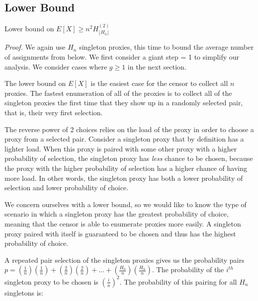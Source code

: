 \subsection{Lower Bound}

\label{theorem:LBEX}
\begin{theorem} {Lower bound on $E[X] \geq n^2H^{(2)}_{\lfloor{H_n}\rfloor}$}
\end{theorem}

\emph{Proof.} We again use $H_n$ singleton proxies, this time to bound the average number of assignments from below. We first consider a giant step = 1 to simplify our analysis. We consider cases where $g\geq1$ in the next section. 

The lower bound on $E[X]$ is the easiest case for the censor to collect all $n$ proxies. The fastest enumeration of all of the proxies is to collect all of the singleton proxies the first time that they show up in a randomly selected pair, that is, their very first selection. 

The reverse power of 2 choices relies on the load of the proxy in order to choose a proxy from a selected pair. Consider a singleton proxy that by definition has a lighter load. When this proxy is paired with some other proxy with a higher probability of selection, the singleton proxy has \textit{less} chance to be chosen, because the proxy with the higher probability of selection has a higher chance of having more load. In other words, the singleton proxy has both a lower probability of selection and lower probability of choice. 

We concern ourselves with a lower bound, so we would like to know the type of scenario in which a singleton proxy has the greatest probability of choice, meaning that the censor is able to enumerate proxies more easily. A singleton proxy paired with itself is guaranteed to be chosen and thus has the highest probability of choice. 


A repeated pair selection of the singleton proxies gives us the probability pairs $p=(\frac{1}{n})(\frac{1}{n}) + (\frac{2}{n})(\frac{2}{n}) + ... + (\frac{H_n}{n})(\frac{H_n}{n})$. The probability of the $i^{th}$ singleton proxy to be chosen is $(\frac{i}{n})^2$. The probability of this pairing for all $H_n$ singletons is:

